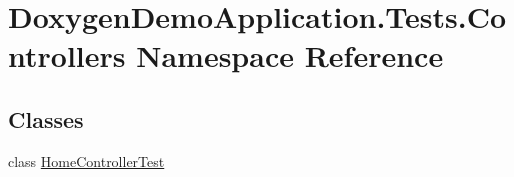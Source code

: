 \hypertarget{namespace_doxygen_demo_application_1_1_tests_1_1_controllers}{}\section{Doxygen\+Demo\+Application.\+Tests.\+Controllers Namespace Reference}
\label{namespace_doxygen_demo_application_1_1_tests_1_1_controllers}
\subsection*{Classes}
\begin{DoxyCompactItemize}
\item 
class \mbox{\hyperlink{class_doxygen_demo_application_1_1_tests_1_1_controllers_1_1_home_controller_test}{Home\+Controller\+Test}}
\end{DoxyCompactItemize}

